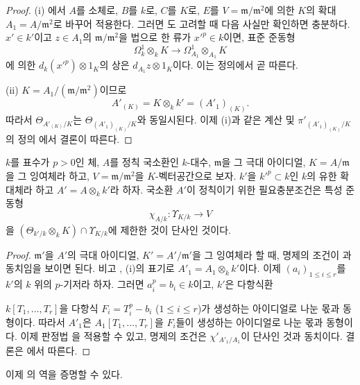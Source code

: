\begin{proof}
(i) 에서 $A$를 소체로, $B$를 $k$로, $C$를
$K$로, $E$를 $V=\mathfrak m/\mathfrak m^2$에 의한 $K$의 확대
$A_1=A/\mathfrak m^2$로 바꾸어 적용한다. 그러면
도 고려할 때 다음 사실만 확인하면 충분하다.
$x'\in k'$이고 $z\in A_1$의 $\mathfrak m/\mathfrak m^2$을 법으로 한
류가 $x'^p\in k$이면, 표준 준동형
\[
  \Omega^1_k\otimes_kK\longrightarrow
  \Omega^1_{A_1}\otimes_{A_1}K
\]
에 의한 $d_k(x'^p)\otimes1_K$의 상은 $d_{A_1}z\otimes1_K$이다.
이는 정의에서 곧 따른다.

(ii) $K=A_1/(\mathfrak m/\mathfrak m^2)$이므로
\[
  A'_{(K)}=K\otimes_kk'=(A'_1)_{(K)}.
\]
따라서 $\Theta_{A'_{(K)}/K}$는
$\Theta_{(A'_1)_{(K)}/K}$와 동일시된다. 이제 (i)과 같은 계산 및
$\pi'_{(A'_1)_{(K)}/K}$의 정의 에서 결론이 따른다.
\end{proof}

\begin{proposition}[22.5.7]
\label{0.22.5.7-ko}
$k$를 표수가 $p>0$인 체, $A$를 정칙 국소환인 $k$-대수,
$\mathfrak m$을 그 극대 아이디얼, $K=A/\mathfrak m$을 그 잉여체라
하고, $V=\mathfrak m/\mathfrak m^2$을 $K$-벡터공간으로 보자.
$k'$을 $k'^p\subset k$인 $k$의 유한 확대체라 하고
$A'=A\otimes_kk'$라 하자. 국소환 $A'$이 정칙이기 위한 필요충분조건은
특성 준동형
\[
  \chi_{A/k}:\Upsilon_{K/k}\longrightarrow V
\]
을
$(\Theta_{k'/k}\otimes_kK)\cap\Upsilon_{K/k}$에 제한한 것이 단사인
것이다.
\end{proposition}

\begin{proof}
$\mathfrak m'$을 $A'$의 극대 아이디얼, $K'=A'/\mathfrak m'$을 그
잉여체라 할 때, 명제의 조건이 과 동치임을 보이면
된다. 비고 , (i)의 표기로
$A'_1=A_1\otimes_kk'$이다. 이제 $(a_i)_{1\leqslant i\leqslant r}$를
$k'$의 $k$ 위의 $p$-기저라 하자. 그러면 $a_i^p=b_i\in k$이고,
$k'$은 다항식환


$k[T_1,\ldots,T_r]$을 다항식 $F_i=T_i^p-b_i$
($1\leqslant i\leqslant r$)가 생성하는 아이디얼로 나눈 몫과 동형이다.
따라서 $A'_1$은 $A_1[T_1,\ldots,T_r]$을 $F_i$들이 생성하는
아이디얼로 나눈 몫과 동형이다. 이제 판정법 을
적용할 수 있고, 명제의 조건은 $\chi'_{A'_1/A_1}$이 단사인 것과
동치이다. 결론은 에서 따른다.
\end{proof}

이제 의 역을 증명할 수 있다.

